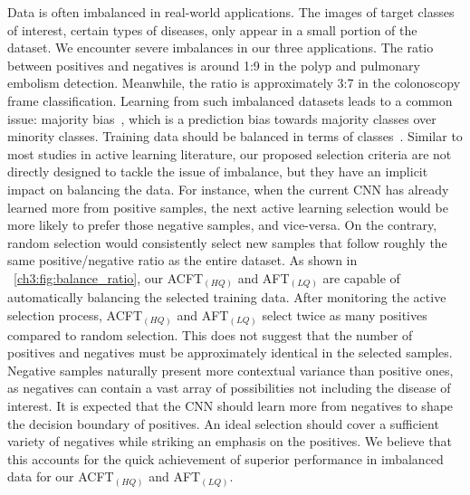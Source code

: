 Data is often imbalanced in real-world applications. The images of target classes of interest, \eg certain types of diseases, only appear in a small portion of the dataset. We encounter severe imbalances in our three applications. The ratio between positives and negatives is around 1:9 in the polyp and pulmonary embolism detection. Meanwhile, the ratio is approximately 3:7 in the colonoscopy frame classification. Learning from such imbalanced datasets leads to a common issue: majority bias~\citep{aggarwal2020active}, which is a prediction bias towards majority classes over minority classes. Training data should be balanced in terms of classes~\citep{japkowicz2002class,he2009learning,buda2018systematic}. Similar to most studies in active learning literature, our proposed selection criteria are not directly designed to tackle the issue of imbalance, but they have an implicit impact on balancing the data. For instance, when the current CNN has already learned more from positive samples, the next active learning selection would be more likely to prefer those negative samples, and vice-versa. On the contrary, random selection would consistently select new samples that follow roughly the same positive/negative ratio as the entire dataset. As shown in \figurename~\ref{ch3:fig:balance_ratio}, our ACFT$_{(HQ)}$ and AFT$_{(LQ)}$ are capable of automatically balancing the selected training data. After monitoring the active selection process, ACFT$_{(HQ)}$ and AFT$_{(LQ)}$ select twice as many positives compared to random selection. This does not suggest that the number of positives and negatives must be approximately identical in the selected samples. Negative samples naturally present more contextual variance than positive ones, as negatives can contain a vast array of possibilities not including the disease of interest. It is expected that the CNN should learn more from negatives to shape the decision boundary of positives. An ideal selection should cover a sufficient variety of negatives while striking an emphasis on the positives. We believe that this accounts for the quick achievement of superior performance in imbalanced data for our ACFT$_{(HQ)}$ and AFT$_{(LQ)}$.

